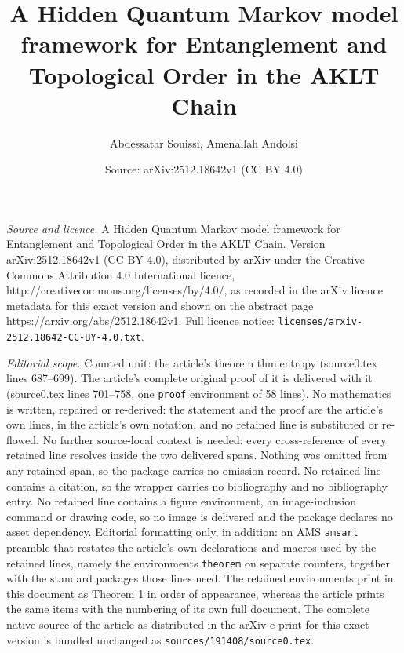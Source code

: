 \documentclass[10pt,a4paper]{amsart}
\title{A Hidden Quantum Markov model framework for Entanglement and Topological Order in the AKLT Chain}
\author{Abdessatar Souissi, Amenallah Andolsi}
\date{Source: arXiv:2512.18642v1 (CC BY 4.0)}
\begin{document}
\maketitle

\noindent\emph{Source and licence.} A Hidden Quantum Markov model framework for Entanglement and Topological Order in the AKLT Chain. Version arXiv:2512.18642v1 (CC BY 4.0), distributed by arXiv under the Creative Commons Attribution 4.0 International licence, http://creativecommons.org/licenses/by/4.0/, as recorded in the arXiv licence metadata for this exact version and shown on the abstract page https://arxiv.org/abs/2512.18642v1. Full licence notice: \texttt{licenses/arxiv-2512.18642-CC-BY-4.0.txt}.\par\smallskip

\noindent\textit{Editorial scope.} Counted unit: the article's theorem thm:entropy (source0.tex lines 687--699). The article's complete original proof of it is delivered with it (source0.tex lines 701--758, one \texttt{proof} environment of 58 lines). No mathematics is written, repaired or re-derived: the statement and the proof are the article's own lines, in the article's own notation, and no retained line is substituted or re-flowed.  No further source-local context is needed: every cross-reference of every retained line resolves inside the two delivered spans.  Nothing was omitted from any retained span, so the package carries no omission record.  No retained line contains a citation, so the wrapper carries no bibliography and no bibliography entry.  No retained line contains a figure environment, an image-inclusion command or drawing code, so no image is delivered and the package declares no asset dependency.  Editorial formatting only, in addition: an AMS \texttt{amsart} preamble that restates the article's own declarations and macros used by the retained lines, namely the environments \texttt{theorem} on separate counters, together with the standard packages those lines need.  The retained environments print in this document as Theorem 1 in order of appearance, whereas the article prints the same items with the numbering of its own full document.  The complete native source of the article as distributed in the arXiv e-print for this exact version is bundled unchanged as \texttt{sources/191408/source0.tex}.
\end{document}
